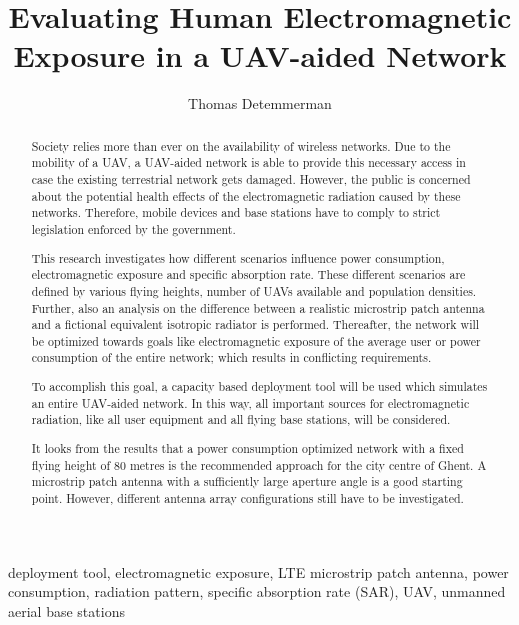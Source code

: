 \documentclass[twocolumn]{phdsymp} %
\begin{document}
\title{Evaluating Human Electromagnetic Exposure in a \gls{UAV}-aided Network}

\author{Thomas Detemmerman}


\maketitle

\begin{abstract}
Society relies more than ever on the availability of wireless networks.
Due to the mobility of a UAV, a UAV-aided network is able to provide this necessary access in case the existing terrestrial network gets damaged.
However,  the public is 
concerned about the potential health effects of the electromagnetic radiation caused by these networks.
Therefore, mobile devices and base stations have to comply to strict legislation enforced by the government.

This research investigates how different scenarios influence power consumption, electromagnetic exposure and specific absorption rate.
These different scenarios are defined by various flying heights, number of UAVs available and population densities. Further, also 
an analysis on the difference
between a realistic microstrip patch antenna and a fictional equivalent isotropic radiator is performed.
Thereafter, the network will be optimized towards goals like electromagnetic exposure of the average user or 
power consumption of the entire network; which results in conflicting requirements.

To accomplish this goal, a capacity based deployment tool will be used which simulates an entire UAV-aided network.
In this way, all important sources for electromagnetic radiation, like all user equipment and all flying base stations, 
will be considered.

It looks from the results that a power consumption optimized network with a fixed flying height of 80 metres is the recommended approach
for the city centre of Ghent.
A microstrip patch 
antenna with a sufficiently large aperture angle is a good starting point. However, different antenna array configurations still have to 
be investigated.
\end{abstract}

\begin{keywords}
deployment tool,  electromagnetic exposure, LTE
microstrip patch antenna, power consumption,
radiation pattern, specific absorption rate (SAR),
UAV, unmanned aerial base stations
\end{keywords}
\end{document}

